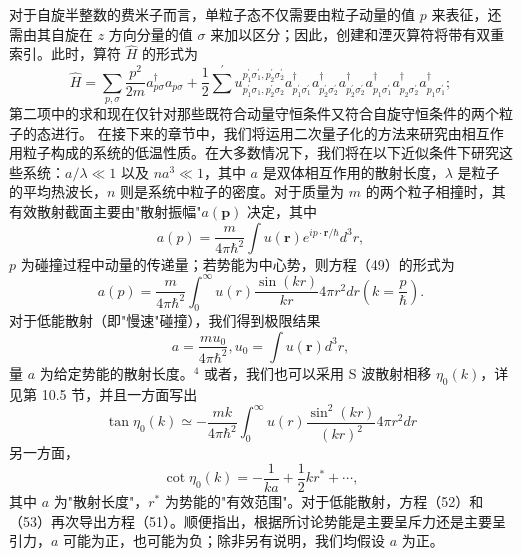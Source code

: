 对于自旋半整数的费米子而言，单粒子态不仅需要由粒子动量的值 \(p\) 来表征，还需由其自旋在 \(z\) 方向分量的值 \(\sigma\) 来加以区分；因此，创建和湮灭算符将带有双重索引。此时，算符 \(\hat{H}\) 的形式为
\begin{equation}\tag{11.1.59}\label{eq:11.1.59}
\hat { H } = \sum _ { p , \sigma } \frac { p ^{2} } { 2 m } a _ { p \sigma } ^{\dagger} a _ { p \sigma } + \frac { 1 } { 2 } \sum ^{\prime} u _ { p _ { 1 } ^{\prime} \sigma _ { 1 } , p _ { 2 } ^{\prime} \sigma _ { 2 } } ^{p _ { 1} ^{\prime} \sigma _ { 1 } ^{\prime} , p _ { 2 } ^{\prime} \sigma _ { 2 } ^{\prime} } a _ { p _ { 1 } ^{\prime} \sigma _ { 1 } ^{\prime} } ^{\dagger} a _ { p _ { 2 } ^{\prime} \sigma _ { 2 } ^{\prime} } ^{\dagger} a _ { p _ { 2 } ^{\prime} \sigma _ { 2 } ^{\prime} } ^{\dagger} a _ { p _ { 1 } \sigma _ { 1 } ^{\prime} } ^{\dagger} a _ { p _ { 2 } \sigma _ { 2 } ^{\prime} } ^{\dagger} a _ { p _ { 1 } \sigma _ { 1 } ^{\prime} } ^{\dagger} ;
\end{equation}
第二项中的求和现在仅针对那些既符合动量守恒条件又符合自旋守恒条件的两个粒子的态进行。
在接下来的章节中，我们将运用二次量子化的方法来研究由相互作用粒子构成的系统的低温性质。在大多数情况下，我们将在以下近似条件下研究这些系统：\(a/\lambda \ll 1\) 以及 \(na^3 \ll 1\)，其中 \(a\) 是双体相互作用的散射长度，\(\lambda\) 是粒子的平均热波长，\(n\) 则是系统中粒子的密度。对于质量为 \(m\) 的两个粒子相撞时，其有效散射截面主要由"散射振幅"\(a(\mathbf{p})\) 决定，其中
\begin{equation}\tag{11.1.60}\label{eq:11.1.60}
a ( p ) = \frac { m } { 4 \pi \hbar ^{2} } \int u ( \mathbf { r } ) e ^{i p \cdot \mathbf { r} / \hbar } d ^{3} r ,
\end{equation}
\(p\) 为碰撞过程中动量的传递量；若势能为中心势，则方程（49）的形式为
\begin{equation}\tag{11.1.61}\label{eq:11.1.61}
a ( p ) = \frac { m } { 4 \pi \hbar ^{2} } \int _ { 0 } ^{\infty} u ( r ) \frac { \sin ( k r ) } { k r } 4 \pi r ^{2} d r  \left( k = \frac { p } { \hbar } \right) .
\end{equation}
对于低能散射（即"慢速"碰撞），我们得到极限结果
\begin{equation}\tag{11.1.62}\label{eq:11.1.62}
a = \frac { m u _ { 0 } } { 4 \pi \hbar ^{2} } ,  u _ { 0 } = \int u ( \mathbf { r } ) d ^{3} r ,
\end{equation}
量 \(a\) 为给定势能的散射长度。\(^{4}\) 或者，我们也可以采用 S 波散射相移 \(\eta_{0}(k)\)，详见第 10.5 节，并且一方面写出
\begin{equation}\tag{11.1.63}\label{eq:11.1.63}
\tan \eta _ { 0 } ( k ) \simeq - \frac { m k } { 4 \pi \hbar ^{2} } \int _ { 0 } ^{\infty} u ( r ) \frac { \sin ^{2} ( k r ) } { ( k r ) ^{2} } 4 \pi r ^{2} d r
\end{equation}
另一方面，
\begin{equation}\tag{11.1.64}\label{eq:11.1.64}
\cot \eta _ { 0 } ( k ) = - \frac { 1 } { k a } + \frac { 1 } { 2 } k r ^{*} + \cdots ,
\end{equation}
其中 \(a\) 为"散射长度"，\(r^{*}\) 为势能的"有效范围"。对于低能散射，方程（52）和（53）再次导出方程（51）。顺便指出，根据所讨论势能是主要呈斥力还是主要呈引力，\(a\) 可能为正，也可能为负；除非另有说明，我们均假设 \(a\) 为正。
